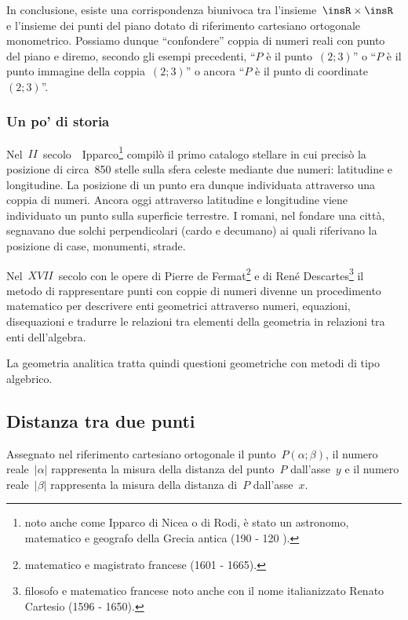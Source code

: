 In conclusione, esiste una corrispondenza biunivoca tra l'insieme~$\insR\times \insR$ e l'insieme dei punti del piano dotato di
riferimento cartesiano ortogonale monometrico. Possiamo dunque ``confondere'' coppia di numeri reali con punto del piano e
diremo, secondo gli esempi precedenti, ``$P$ è il punto~$(2;3)$'' o ``$P$
è il punto immagine della coppia~$(2;3)$'' o ancora ``$P$ è il punto di coordinate~$(2;3)$''.

\subsubsection*{Un po' di storia}
Nel~$II$~secolo~\aC\ Ipparco\footnote{noto anche come Ipparco di Nicea o di Rodi, è stato un astronomo, matematico e geografo della Grecia antica (190 \aC - 120 \aC).} compilò il primo catalogo stellare in cui precisò la posizione di circa~850 stelle sulla sfera celeste
mediante due numeri: latitudine e longitudine. La posizione di un punto era dunque individuata attraverso una coppia di numeri.
Ancora oggi attraverso latitudine e longitudine viene individuato un punto sulla superficie terrestre.
I romani, nel fondare una città, segnavano due solchi perpendicolari (cardo e decumano) ai quali riferivano la posizione di case, monumenti, strade.

Nel~$XVII$~secolo con le opere di Pierre de Fermat\footnote{matematico e magistrato francese (1601 - 1665).} e di René Descartes\footnote{filosofo e matematico francese noto anche con il nome italianizzato Renato Cartesio (1596 - 1650).} il metodo di rappresentare punti con coppie di numeri divenne
un procedimento matematico per descrivere enti geometrici attraverso numeri, equazioni, disequazioni e tradurre le relazioni
tra elementi della geometria in relazioni tra enti dell'algebra.

La geometria analitica tratta quindi questioni geometriche con metodi di tipo algebrico.

\vspazio\ovalbox{\risolvi \ref{ese:\thechapter.20}}

\subsection{Distanza tra due punti}
Assegnato nel riferimento cartesiano ortogonale il punto~$P(\alpha; \beta)$, il numero reale~$|\alpha|$ rappresenta la
misura della distanza del punto~$P$ dall'asse~$y$ e il numero reale~$|\beta|$ rappresenta la misura della distanza di~$P$
dall'asse~$x$.

